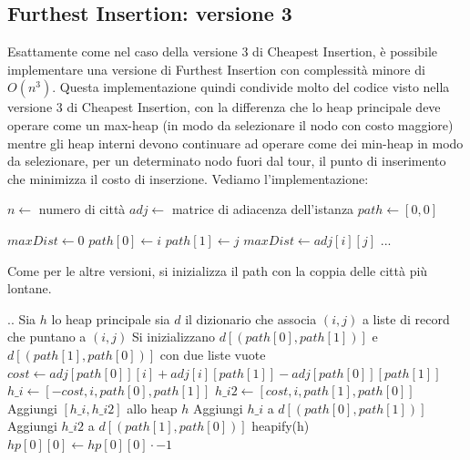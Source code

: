 \documentclass[a4paper,12pt]{report}
\begin{document}
\subsection{Furthest Insertion: versione 3}
Esattamente come nel caso della versione 3 di Cheapest Insertion, è possibile implementare una versione di Furthest Insertion con complessità minore di $O(n^3)$. Questa implementazione quindi condivide molto del codice visto nella versione 3 di Cheapest Insertion, con la differenza che lo heap principale deve operare come un max-heap (in modo da selezionare il nodo con costo maggiore) mentre gli heap interni devono continuare ad operare come dei min-heap in modo da selezionare, per un determinato nodo fuori dal tour, il punto di inserimento che minimizza il costo di inserzione. Vediamo l'implementazione:
\begin{tcolorbox}[colframe=black, colback=white, boxrule=0.5pt, title=Furthest Insertion Versione 3, coltitle=black, fonttitle=\bfseries, colbacktitle=white, breakable]
  \begin{algorithmic}[1]
    \State $n \gets$ numero di città
    \State $adj \gets$ matrice di adiacenza dell'istanza
    \State $path \gets [0, 0]$
    
    \State $maxDist \gets 0$
          \State $path[0] \gets i$
          \State $path[1] \gets j$
          \State $maxDist \gets adj[i][j]$
        \EndIf
      \EndFor
    \EndFor
    \State ...
  \end{algorithmic}
\end{tcolorbox}
Come per le altre versioni, si inizializza il path con la coppia delle città più lontane.
\begin{tcolorbox}[colframe=black, colback=white, boxrule=0.5pt, title=Cheapest Insertion Versione 3, coltitle=black, fonttitle=\bfseries, colbacktitle=white, breakable]
  \begin{algorithmic}[1]
    \State ..
    \State Sia $h$ lo heap principale
    \State sia $d$ il dizionario che associa $(i, j)$ a liste di record che puntano a $(i, j)$
    \State Si inizializzano $d[(path[0], path[1])]$ e $d[(path[1], path[0])]$ con due liste vuote
      \State $cost \gets adj[path[0]][i] + adj[i][path[1]] - adj[path[0]][path[1]]$
      \State $h\_i \gets [-cost, i, path[0], path[1]]$
      \State $h\_i2 \gets [cost, i, path[1], path[0]]$
      \State Aggiungi $[h\_i, h\_i2]$ allo heap $h$
      \State Aggiungi $h\_i$ a $d[(path[0], path[1])]$
      \State Aggiungi $h\_i2$ a $d[(path[1], path[0])]$
    \EndFor
    \State heapify(h)
      \State $hp[0][0] \gets hp[0][0] \cdot -1$
    \EndFor
  \end{algorithmic}
\end{tcolorbox}
\end{document}
